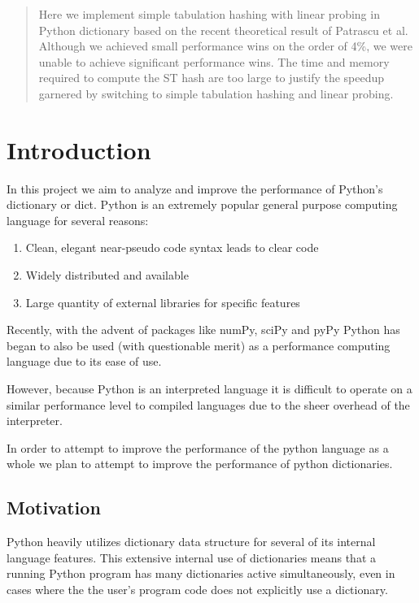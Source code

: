 \documentclass[11pt]{article}
\begin{document}
\maketitle
\doublespace

\begin{abstract}
Here we implement simple tabulation hashing with linear probing in Python dictionary based on the recent theoretical result of Patrascu et al. Although we achieved small performance wins on the order of 4\%, we were unable to achieve significant performance wins.  The time and memory required to compute the ST hash are too large to justify the speedup garnered by switching to simple tabulation hashing and linear probing.
\end{abstract}


\section{Introduction}
In this project we aim to analyze and improve the performance of Python’s dictionary or dict.  Python is an extremely popular general purpose computing language for several reasons:
\begin{enumerate}
 \item Clean, elegant near-pseudo code syntax leads to clear code 
 \item Widely distributed and available
 \item Large quantity of external libraries for specific features 
\end{enumerate}

Recently, with the advent of packages like numPy, sciPy and pyPy Python has began to also be used (with questionable merit) as a performance computing language due to its ease of use.

However, because Python is an interpreted language it is difficult to operate on a similar performance level to compiled languages due to the sheer overhead of the interpreter.

In order to attempt to improve the performance of the python language as a whole we plan to attempt to improve the performance of python dictionaries.

\subsection{Motivation}
Python heavily utilizes dictionary data structure for several of its internal language features. This extensive internal use of dictionaries means that a running Python program has many dictionaries active simultaneously, even in cases where the the user’s program code does not explicitly use a dictionary. 
\end{document}
